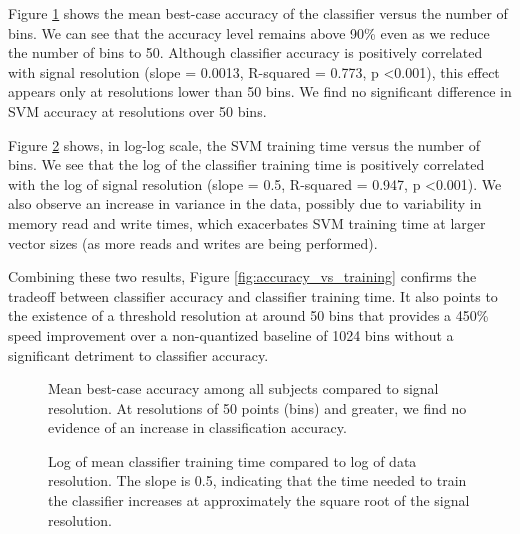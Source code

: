 Figure \ref{fig:accuracy_vs_bins} shows the mean best-case accuracy of the classifier versus the number of bins. We can see that the accuracy level remains above 90\% even as we reduce the number of bins to 50. Although classifier accuracy is positively correlated with signal resolution (slope = 0.0013, R-squared = 0.773, p \textless 0.001), this effect appears only at resolutions lower than 50 bins. We find no significant difference in SVM accuracy at resolutions over 50 bins.

Figure \ref{fig:training_vs_bins} shows, in log-log scale, the SVM training time versus the number of bins. We see that the log of the classifier training time is positively correlated with the log of signal resolution (slope = 0.5, R-squared = 0.947, p \textless 0.001). We also observe an increase in variance in the data, possibly due to variability in memory read and write times, which exacerbates SVM training time at larger vector sizes (as more reads and writes are being performed).

Combining these two results, Figure \ref{fig:accuracy_vs_training} confirms the tradeoff between classifier accuracy and classifier training time. It also points to the existence of a threshold resolution at around 50 bins that provides a 450\% speed improvement over a non-quantized baseline of 1024 bins without a significant detriment to classifier accuracy.


\begin{figure}[!h]
  \centering
   {}
  \caption{Mean best-case accuracy among all subjects compared to signal resolution. At resolutions of 50 points (bins) and greater, we find no evidence of an increase in classification accuracy. }
  \label{fig:accuracy_vs_bins}
  \vspace{-0.1cm}
 \end{figure}

 \begin{figure}[!h]
  \vspace{-0.2cm}
  \centering
   {}
  \caption{Log of mean classifier training time compared to log of data resolution. The slope is 0.5, indicating that the time needed to train the classifier increases at approximately the square root of the signal resolution.}
  \label{fig:training_vs_bins}
  \vspace{-0.1cm}
 \end{figure}

